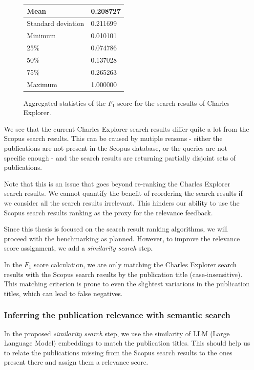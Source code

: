 \begin{figure}[!ht]
    \captionsetup{width=.9\linewidth}
    \centering
    \begin{tabular}{|l|l|}
    \hline
        Mean & 0.208727 \\ \hline
        Standard deviation & 0.211699 \\ \hline
        Minimum & 0.010101 \\ \hline
        25\% & 0.074786 \\ \hline
        50\% & 0.137028 \\ \hline
        75\% & 0.265263 \\ \hline
        Maximum & 1.000000 \\ \hline
    \end{tabular}
    \caption{Aggregated statistics of the $F_1$ score for the search results of Charles Explorer.}
\end{figure}

We see that the current Charles Explorer search results differ quite a lot from the Scopus search results. 
This can be caused by mutiple reasons - either the publications are not present in the Scopus database, or the queries are not specific enough - and the search results are returning partially disjoint sets of publications.

Note that this is an issue that goes beyond re-ranking the Charles Explorer search results. 
We cannot quantify the benefit of reordering the search results if we consider all the search results irrelevant.
This hinders our ability to use the Scopus search results ranking as the proxy for the relevance feedback.

Since this thesis is focused on the search result ranking algorithms, we will proceed with the benchmarking as planned. 
However, to improve the relevance score assignment, we add a \textit{similarity search} step. 
 
In the $F_1$ score calculation, we are only matching the Charles Explorer search results with the Scopus search results by the publication title (case-insensitive). 
This matching criterion is prone to even the slightest variations in the publication titles, which can lead to false negatives.

\subsubsection{Inferring the publication relevance with semantic search}\label{semantic-search}

In the proposed \textit{similarity search} step, we use the similarity of LLM (Large Language Model) embeddings to match the publication titles. 
This should help us to relate the publications missing from the Scopus search results to the ones present there and assign them a relevance score.


